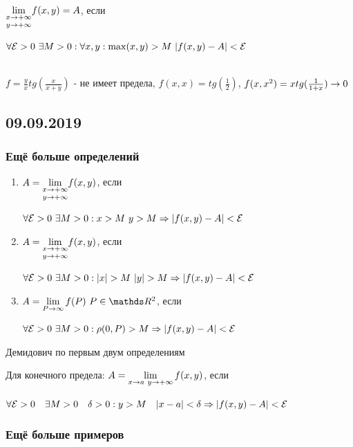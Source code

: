 \documentclass[12pt, fleqn]{article}
\begin{document}
\begin{definition}\\
    $\underset{y \rightarrow +\infty}{\lim\limits_{x \rightarrow +\infty}} f(x,y)=A$, если

    $\forall \mathcal{E}>0 \ \exists M>0: \forall x,y: \max(x,y)>M \ |f(x,y)-A|<\mathcal{E}$
\end{definition}

\begin{example}\\
    $f=\frac{y}{x} tg(\frac{x}{x+y})$ - не имеет предела, $f(x,x)=tg(\frac{1}{2})$, $f(x,x^2)=x tg(\frac{1}{1+x}) \rightarrow 0$
\end{example}

\newpage
\subsection{09.09.2019}
\subsubsection{Ещё больше определений}
\begin{definition}
\begin{enumerate}
        \item $A=\underset{y \rightarrow +\infty}{\lim\limits_{x \rightarrow +\infty}} f(x,y)$, если

        $\forall \E>0 \ \e M>0: x>M \ y>M \Ra |f(x,y)-A| < \E$
        \item $A=\underset{y \rightarrow +\infty}{\lim\limits_{x \rightarrow +\infty}} f(x,y)$, если

        $\forall \E>0 \ \e M>0: |x|>M \ |y|>M \Ra |f(x,y)-A| < \E$
        \item $A=\lim\limits_{P \ra \infty} f(P) \ P \in \R^2$, если

        $\forall \mathcal{E}>0 \ \exists M>0: \rho(0, P)>M \Rightarrow |f(x,y)-A| < \mathcal{E}$
    \end{enumerate}
\end{definition}

\begin{remark}
    Демидович по первым двум определениям
\end{remark}

\begin{definition}
    Для конечного предела: $A=\lim\limits_{x \rightarrow a \  y \rightarrow +\infty} f(x,y)$, если

    $\forall \mathcal{E}>0 \quad \exists M>0 \quad \delta > 0: y>M \quad |x-a| < \delta \Rightarrow |f(x,y)-A| < \mathcal{E}$
\end{definition}

\subsubsection{Ещё больше примеров}
\end{document}
